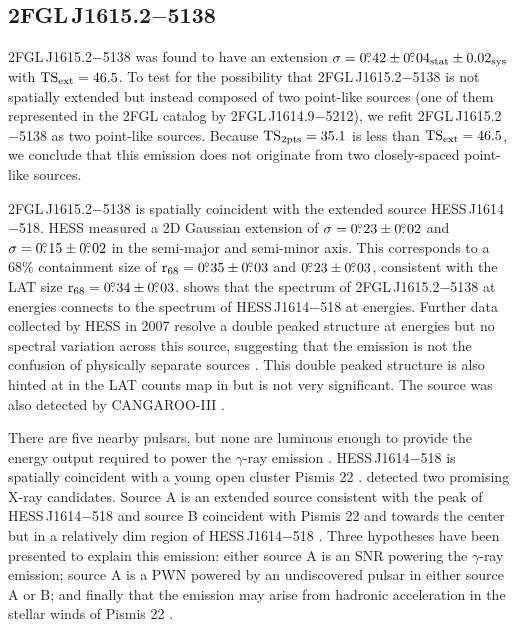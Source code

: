 \subsection{2FGL\,J1615.2$-$5138}

2FGL\,J1615.2$-$5138 was found
 to have an extension $\sigma=0\mbox{$.\!\!^\circ$}42\pm0\mbox{$.\!\!^\circ$}04_\text{stat}\pm0.02_\text{sys}$
with $\mathrm{TS}_\mathrm{ext}=46.5$.
To test for the possibility that
2FGL\,J1615.2$-$5138 is not spatially extended but instead composed
of two point-like sources (one of them represented in the 2FGL catalog by
2FGL\,J1614.9$-$5212), we refit 2FGL\,J1615.2$-$5138 as two point-like
sources.  Because $\mathrm{TS}_{\mathrm{2pts}}=35.1$ is less than $\mathrm{TS}_\mathrm{ext}=46.5$, we conclude that
this emission does not originate from two closely-spaced point-like sources.

2FGL\,J1615.2$-$5138 is spatially coincident with 
the extended \tev source HESS\,J1614$-$518.
\ac{HESS} measured a 2D Gaussian extension of $\sigma=0\mbox{$.\!\!^\circ$}23\pm0\mbox{$.\!\!^\circ$}02$
and $\sigma=0\mbox{$.\!\!^\circ$}15\pm0\mbox{$.\!\!^\circ$}02$ in the semi-major and
semi-minor axis. This corresponds to a 68\% containment size of
${\mathrm{r}_{68}}=0\mbox{$.\!\!^\circ$}35\pm0\mbox{$.\!\!^\circ$}03$ and $0\mbox{$.\!\!^\circ$}23\pm0\mbox{$.\!\!^\circ$}03$,  consistent with
the LAT size ${\mathrm{r}_{68}}=0\mbox{$.\!\!^\circ$}34\pm0\mbox{$.\!\!^\circ$}03$.  
shows that the spectrum of 2FGL\,J1615.2$-$5138 at \gev energies connects
to the spectrum of HESS\,J1614$-$518 at \tev energies.  Further data
collected by \ac{HESS} in 2007 resolve a double peaked structure at
\tev energies but no spectral variation across this source, suggesting
that the emission is not the confusion of physically separate sources
\citep{rowell_2008a_closer-unidentified}.  This double peaked structure is
also hinted at in the LAT counts map in 
but is not very significant.  The \tev source was also detected by
CANGAROO-III \citep{mizukami_2011a_cangaroo-iii-observation}.

There are five nearby pulsars, but none are luminous enough to
provide the energy output required to power the $\gamma$-ray
emission \citep{rowell_2008a_closer-unidentified}.  HESS\,J1614$-$518
is spatially coincident with a young open cluster Pismis 22
\citep{landi_2007a_j1614-518:-detection,rowell_2008a_closer-unidentified}.  \suzaku detected
two promising X-ray candidates. Source A is an extended source consistent
with the peak of HESS\,J1614$-$518 and source B coincident with Pismis 22
and towards the center but in a relatively dim region of HESS\,J1614$-$518
\citep{matsumoto_2008a_discovery-extended}.  Three hypotheses have been presented to
explain this emission: either source A is an SNR powering the $\gamma$-ray
emission; source A is a PWN powered by an undiscovered pulsar in either
source A or B; and finally that the emission may arise from hadronic
acceleration in the stellar winds of Pismis 22 \citep{mizukami_2011a_cangaroo-iii-observation}.

